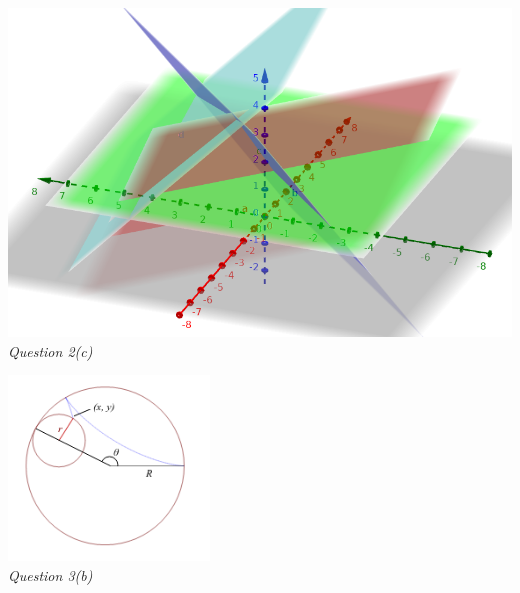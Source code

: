 \documentclass[a4paper,addpoints]{exam}
\begin{document}
\begin{center}
  \includegraphics[width=\textwidth]{nasty-inequalities}\\
  \textit{Question 2(c)}

  \vspace*{2cm}

  \includegraphics[width=0.4\textwidth]{hypo}\\
  \textit{Question 3(b)}
\end{center}
\end{document}
